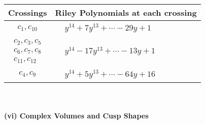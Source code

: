 \documentclass[1p]{elsarticle_modified}
\theoremstyle{definition}
\begin{document}
\begin{tabular}{m{50pt}|m{274pt}}
Crossings & \hspace{64pt}Riley Polynomials at each crossing \\
\hline $$\begin{aligned}c_{1},c_{10}\end{aligned}$$&$\begin{aligned}
&y^{14}+7 y^{13}+\cdots-29 y+1
\end{aligned}$\\
\hline $$\begin{aligned}c_{2},c_{3},c_{5}\\c_{6},c_{7},c_{8}\\c_{11},c_{12}\end{aligned}$$&$\begin{aligned}
&y^{14}-17 y^{13}+\cdots-13 y+1
\end{aligned}$\\
\hline $$\begin{aligned}c_{4},c_{9}\end{aligned}$$&$\begin{aligned}
&y^{14}+5 y^{13}+\cdots-64 y+16
\end{aligned}$\\
\hline
\end{tabular}\\~\\
\newpage\flushleft \textbf{(vi) Complex Volumes and Cusp Shapes}
\end{document}
